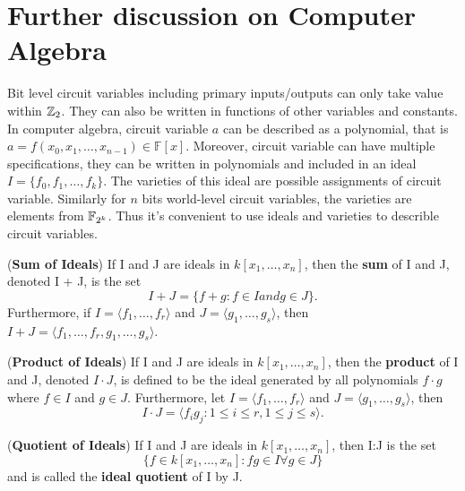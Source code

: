 \section{Further discussion on Computer Algebra}
\label{sec:moretheory}

Bit level circuit variables including primary inputs/outputs can only take value
within ${\mathbb{Z}}_2$. They can also be written in functions of other variables and constants.
In computer algebra, circuit variable $a$ can be described as a polynomial, that is
$a = f(x_0, x_1, \dots, x_{n-1}) \in {\mathbb{F}}[x]$. Moreover, circuit variable can
have multiple specifications, they can be written in polynomials and included in an
ideal $I = \{f_0, f_1, \dots, f_k\}$. The varieties of this ideal are possible 
assignments of circuit variable. Similarly for $n$ bits world-level circuit 
variables, the varieties are elements from ${\mathbb{F}}_{2^k}$. Thus it's convenient to use
ideals and varieties to describle circuit variables. \par

\begin{Definition}
({\bf Sum of Ideals}) If I and J are ideals in $k[x_1, \dots, x_n]$, then the 
{\bf sum} of I and J, denoted I + J, is the set
  \begin{equation}
  I + J = \{f + g : f \in I and g \in J\}.
  \end{equation}
Furthermore, if $I = \langle f_1, \dots, f_r\rangle$ and 
$J = \langle g_1, \dots, g_s\rangle$, then 
$I + J = \langle f_1, \dots, f_r, g_1, \dots, g_s\rangle$.
\end{Definition}

\begin{Definition}
({\bf Product of Ideals}) If I and J are ideals in $k[x_1, \dots, x_n]$, then the
{\bf product} of I and J, denoted $I \cdot J$, is defined to be the ideal generated 
by all polynomials $f \cdot g$ where $f \in I$ and $g \in J$. Furthermore, let
$I = \langle f_1, \dots, f_r\rangle$ and $J = \langle g_1, \dots, g_s\rangle$, then
  \begin{equation}
  I \cdot J = \langle f_ig_j : 1 \leq i \leq r, 1 \leq j \leq s\rangle .
  \end{equation}
\end{Definition}

\begin{Definition}
({\bf Quotient of Ideals}) If I and J are ideals in $k[x_1, \dots, x_n]$, then I:J
is the set
  \begin{equation}
  \{f \in k[x_1, \dots, x_n] : fg \in I \forall g \in J\}
  \end{equation}
and is called the {\bf ideal quotient} of I by J.
\end{Definition}

